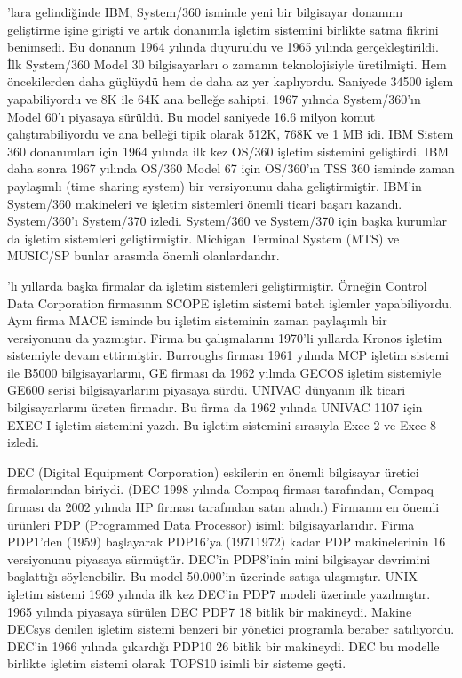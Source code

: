 \documentclass[a4paper,10pt,turkish]{sphinxmanual}
\begin{document}
’lara gelindiğinde IBM, System/360 isminde yeni bir bilgisayar donanımı geliştirme
işine girişti ve artık donanımla işletim sistemini birlikte satma fikrini benimsedi. Bu
donanım 1964 yılında duyuruldu ve 1965 yılında gerçekleştirildi. İlk System/360 Model 30
bilgisayarları o zamanın  teknolojisiyle üretilmişti. Hem
öncekilerden daha güçlüydü hem de daha az yer kaplıyordu. Saniyede 34500 işlem
yapabiliyordu ve 8K ile 64K ana belleğe sahipti. 1967 yılında System/360’ın Model 60’ı
piyasaya sürüldü. Bu model saniyede 16.6 milyon komut çalıştırabiliyordu ve ana belleği
tipik olarak 512K, 768K ve 1 MB idi. IBM Sistem 360 donanımları için 1964 yılında ilk kez
OS/360 işletim sistemini geliştirdi. IBM daha sonra 1967 yılında OS/360 Model 67 için
OS/360’ın TSS 360 isminde zaman paylaşımlı (time sharing system) bir versiyonunu daha
geliştirmiştir. IBM’in System/360 makineleri ve işletim sistemleri önemli ticari başarı
kazandı. System/360’ı System/370 izledi. System/360 ve System/370 için başka kurumlar da
işletim sistemleri geliştirmiştir. Michigan Terminal System (MTS) ve MUSIC/SP bunlar
arasında önemli olanlardandır.

’lı yıllarda başka firmalar da işletim sistemleri geliştirmiştir. Örneğin Control Data
Corporation firmasının SCOPE işletim sistemi batch işlemler yapabiliyordu. Aynı firma MACE
isminde bu işletim sisteminin zaman paylaşımlı bir versiyonunu da yazmıştır. Firma bu
çalışmalarını 1970’li yıllarda Kronos işletim sistemiyle devam ettirmiştir. Burroughs
firması 1961 yılında MCP işletim sistemi ile B5000 bilgisayarlarını, GE firması da 1962
yılında GECOS işletim sistemiyle GE\sphinxhyphen{}600 serisi bilgisayarlarını piyasaya sürdü. UNIVAC
dünyanın ilk ticari bilgisayarlarını üreten firmadır. Bu firma da 1962 yılında UNIVAC 1107
için EXEC I işletim sistemini yazdı. Bu işletim sistemini sırasıyla Exec 2 ve Exec 8 izledi.

\sphinxAtStartPar
DEC (Digital Equipment Corporation) eskilerin en önemli bilgisayar üretici firmalarından
biriydi. (DEC 1998 yılında Compaq firması tarafından, Compaq firması da 2002 yılında HP
firması tarafından satın alındı.) Firmanın en önemli ürünleri PDP (Programmed Data
Processor) isimli bilgisayarlarıdır. Firma PDP\sphinxhyphen{}1’den (1959) başlayarak PDP\sphinxhyphen{}16’ya
(1971\sphinxhyphen{}1972) kadar PDP makinelerinin 16 versiyonunu piyasaya sürmüştür. DEC’in PDP\sphinxhyphen{}8’inin
mini bilgisayar devrimini başlattığı söylenebilir. Bu model 50.000’in üzerinde satışa
ulaşmıştır. UNIX işletim sistemi 1969 yılında ilk kez DEC’in PDP\sphinxhyphen{}7 modeli üzerinde
yazılmıştır. 1965 yılında piyasaya sürülen DEC PDP\sphinxhyphen{}7 18 bitlik bir makineydi. Makine
DECsys denilen işletim sistemi benzeri bir yönetici programla beraber satılıyordu. DEC’in
1966 yılında çıkardığı PDP\sphinxhyphen{}10 26 bitlik bir makineydi. DEC bu modelle birlikte işletim
sistemi olarak TOPS\sphinxhyphen{}10 isimli bir sisteme geçti.
\end{document}
